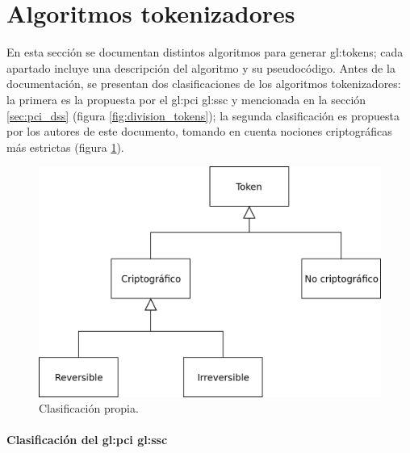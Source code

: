 %
%

\section{Algoritmos tokenizadores}
\label{sec:algoritmos}

En esta sección se documentan distintos algoritmos para generar
\glspl{gl:token}; cada apartado incluye una descripción del
algoritmo y su pseudocódigo. Antes de la documentación, se presentan
dos clasificaciones de los algoritmos tokenizadores: la primera es la propuesta
por el \gls{gl:pci} \gls{gl:ssc} y mencionada en la sección \ref{sec:pci_dss}
(figura \ref{fig:division_tokens}); la segunda clasificación es propuesta por
los autores de este documento, tomando en cuenta nociones criptográficas más
estrictas (figura \ref{fig:division_propia}).

\begin{figure}[h]
  \begin{center}
    \includegraphics[width=0.5\linewidth]
      {../../../../diagramas_comunes/clasificacion/clasificacion_propia.png}
    \caption{Clasificación propia.}
    \label{fig:division_propia}
  \end{center}
\end{figure}

\paragraph{Clasificación del
  \texorpdfstring{\acrlong{gl:pci}}{PCI} \texorpdfstring{\acrlong{gl:ssc}}{SSC}}

